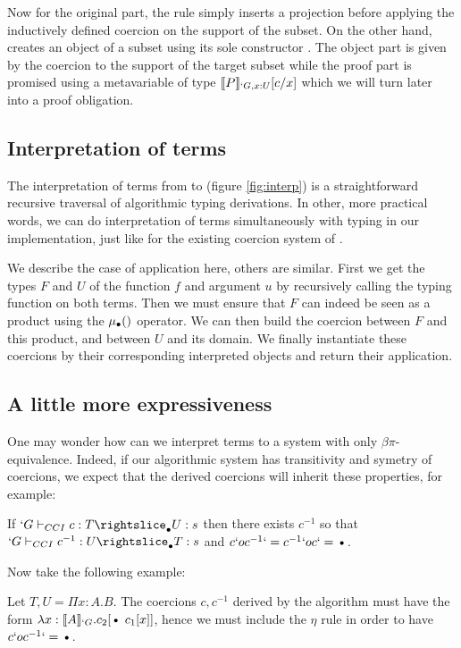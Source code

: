 \documentclass{llncs}
\begin{document}
Now for the original part, the  rule simply inserts a
projection before applying the inductively defined coercion on the
support of the subset. On the other hand,  creates an
object of a subset using its sole constructor . The object
part is given by the coercion to the support of the target subset
while the proof part is promised using a metavariable of type $\llbracket P \rrbracket_{`G, x : U}[c/x]$ which
we will turn later into a proof obligation. 

\subsection{Interpretation of terms}
The interpretation of terms from \Russell to \CICq (figure
\vref{fig:interp}) is a straightforward
recursive traversal of algorithmic typing derivations. In other, more
practical words, we can do interpretation of terms simultaneously with
typing in our implementation, just like for the existing coercion system
of \Coq. 


We describe the case of application here, others are similar. First we
get the types $F$ and $U$ of the function $f$ and argument $u$ by recursively calling the
typing function on both terms. Then we must ensure that $F$ can indeed
be seen as a product using the $\mualgo$ operator. We can then build
the coercion between $F$ and this product, and between $U$ and its
domain. We finally instantiate these coercions by their corresponding
interpreted objects and return their application.

\subsection{A little more expressiveness}
One may wonder how can we interpret \Russell terms to a system with only
$\beta\pi$-equivalence. 
Indeed, if our algorithmic system has transitivity and symetry of
coercions, we expect that the derived coercions will inherit these
properties, for example:
\begin{proposition}
  If $\subimpl{`G}{c}{T}{U}{s}$ then there exists $c^{-1}$ so that
  $\subimpl{`G}{c^{-1}}{U}{T}{s}$ and $c `o c^{-1} `= c^{-1} `o c `=
  \ctxdot$.
\end{proposition}

Now take the following example:
\begin{example}
  Let $T, U = \Pi x : A.B$. The coercions $c, c^{-1}$ derived by
  the algorithm must have the form $\lambda x :
  \ip{A}{`G}.c_2[\ctxdot~c_1[x]]$, hence we must include the $\eta$
  rule in order to have $c `o c^{-1} `= \ctxdot$.
\end{example}
\end{document}
